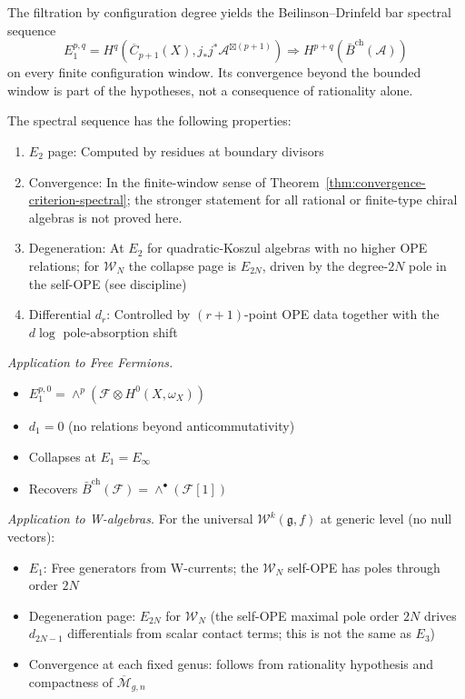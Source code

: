 \begin{theorem}
\label{thm:bar-spectral-sequence-config}
The filtration by configuration degree yields the Beilinson--Drinfeld
bar spectral sequence
\[E_1^{p,q} = H^q(\overline{C}_{p+1}(X), j_*j^*\mathcal{A}^{\boxtimes(p+1)}) \Rightarrow H^{p+q}(\bar{B}^{\text{ch}}(\mathcal{A}))\]
on every finite configuration window. Its convergence beyond the
bounded window is part of the hypotheses, not a consequence of
rationality alone.

The spectral sequence has the following properties:
\begin{enumerate}
\item $E_2$ page: Computed by residues at boundary divisors
\item Convergence: In the finite-window sense of
 Theorem~\ref{thm:convergence-criterion-spectral}; the stronger
 statement for all rational or finite-type chiral algebras is not
 proved here.
\item Degeneration: At $E_2$ for quadratic-Koszul algebras with no higher
 OPE relations; for $\mathcal{W}_N$ the collapse page is $E_{2N}$, driven by
 the degree-$2N$ pole in the self-OPE (see discipline)
\item Differential $d_r$: Controlled by $(r+1)$-point OPE data together with
 the $d\log$ pole-absorption shift
\end{enumerate}

\emph{Application to Free Fermions.}
\begin{itemize}
\item $E_1^{p,0} = \wedge^p(\mathcal{F} \otimes H^0(X, \omega_X))$
\item $d_1 = 0$ (no relations beyond anticommutativity)
\item Collapses at $E_1 = E_{\infty}$
\item Recovers $\bar{B}^{\text{ch}}(\mathcal{F}) = \wedge^{\bullet}(\mathcal{F}[1])$
\end{itemize}

\emph{Application to W-algebras.}
For the universal $\mathcal{W}^k(\mathfrak{g}, f)$ at generic level (no null
vectors):
\begin{itemize}
\item $E_1$: Free generators from W-currents; the $\mathcal{W}_N$ self-OPE
 has poles through order $2N$
\item Degeneration page: $E_{2N}$ for $\mathcal{W}_N$ (the self-OPE maximal
 pole order $2N$ drives $d_{2N-1}$ differentials from scalar contact terms;
 this is not the same as $E_3$)
\item Convergence at each fixed genus: follows from rationality hypothesis
 and compactness of $\overline{\mathcal{M}}_{g,n}$
\end{itemize}
\end{theorem}

